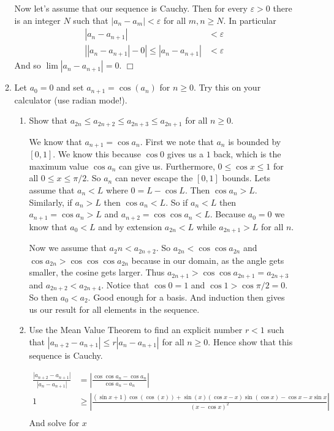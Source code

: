 \documentclass[letterpaper]{article}
\begin{document}
\begin{enumerate}
\begin{enumerate}
  Now let's assume that our sequence is Cauchy. Then for every $\varepsilon>0$ there is an integer $N$ such that $\left\lvert a_n-a_m\right\rvert<\varepsilon$ for all $m,n\ge N$. In particular
  \begin{align*}
    \left\lvert a_n-a_{n+1}\right\rvert&<\varepsilon\\
    \left\lvert |a_n-a_{n+1}|-0\right\rvert\le\left\lvert a_n-a_{n+1}\right\rvert&<\varepsilon
  \end{align*}
  And so $\lim\left\lvert a_n-a_{n+1}\right\rvert=0$.
  $\Box$
  \setcounter{enumii}{7}
  \item
  Let $a_0=0$ and set $a_{n+1}=\cos(a_{n})$ for $n\ge0$. Try this on your calculator (use radian mode!).
    \begin{enumerate}
    \item
    Show that $a_{2n}\le a_{2n+2}\le a_{2n+3}\le a_{2n+1}$ for all $n\ge 0$.

    We know that $a_{n+1}=\cos a_n$. First we note that $a_n$ is bounded by $[0,1]$. We know this because $\cos 0$ gives us a $1$ back, which is the maximum value $\cos a_n$ can give us. Furthermore, $0\le\cos x\le1$ for all $0\le x\le \pi/2$. So $a_n$ can never escape the $[0,1]$ bounds. Lets assume that $a_n<L$ where $0=L-\cos L$. Then $\cos a_n>L$. Similarly, if $a_n>L$ then $\cos a_n<L$. So if $a_n<L$ then $a_{n+1}=\cos a_n>L$ and $a_{n+2}=\cos \cos a_n<L$. Because $a_0=0$ we know that $a_0<L$ and by extension $a_{2n}<L$ while $a_{2n+1}>L$ for all $n$.

    Now we assume that $a_2n<a_{2n+2}$. So $a_{2n}<\cos \cos a_{2n}$ and $\cos a_{2n}>\cos \cos \cos a_{2n}$ because in our domain, as the angle gets smaller, the cosine gets larger. Thus $a_{2n+1}>\cos \cos a_{2n+1}=a_{2n+3}$ and $a_{2n+2}<a_{2n+4}$.
    Notice that $\cos 0=1$ and $\cos 1>\cos \pi/2=0$. So then $a_0<a_2$. Good enough for a basis.
    And induction then gives us our result for all elements in the sequence.
    \item
    Use the Mean Value Theorem to find an explicit number $r<1$ such that $\left\lvert a_{n+2}-a_{n+1}\right\rvert\le r\left\lvert a_n-a_{n+1}\right\rvert$ for all $n\ge0$. Hence show that this sequence is Cauchy.

    \begin{align*}
      \frac{\left\lvert a_{n+2}-a_{n+1}\right\rvert}{\left\lvert a_n-a_{n+1}\right\rvert}&=
      \left\lvert \frac{\cos \cos a_{n}-\cos a_{n}}{\cos a_n-a_n}\right\rvert\\
      1&\ge\left\lvert \frac{(\sin x +1)\cos(\cos(x))+\sin(x)(\cos x -x)\sin(\cos x)-\cos x-x\sin x}{(x-\cos x)^2}\right\rvert\\
    \end{align*}
    And solve for $x$


\end{enumerate}
\end{enumerate}
\end{enumerate}
\end{document}
